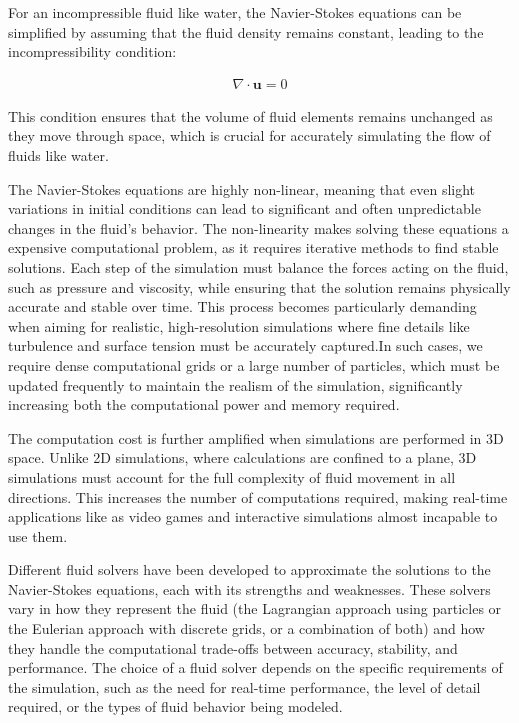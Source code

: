 For an incompressible fluid like water, the Navier-Stokes equations can be simplified by assuming that the fluid density remains constant, leading to the incompressibility condition:

\begin{align}
    \nabla \cdot \mathbf{u} = 0
\end{align}

This condition ensures that the volume of fluid elements remains unchanged as they move through space, which is crucial for accurately simulating the flow of fluids like water.

The Navier-Stokes equations are highly non-linear, meaning that even slight variations in initial conditions can lead to significant and often unpredictable changes in the fluid's behavior. The non-linearity makes solving these equations a expensive computational problem, as it requires iterative methods to find stable solutions. Each step of the simulation must balance the forces acting on the fluid, such as pressure and viscosity, while ensuring that the solution remains physically accurate and stable over time. This process becomes particularly demanding when aiming for realistic, high-resolution simulations where fine details like turbulence and surface tension must be accurately captured.In such cases, we require dense computational grids or a large number of particles, which must be updated frequently to maintain the realism of the simulation, significantly increasing both the computational power and memory required.

The computation cost is further amplified when simulations are performed in 3D space. Unlike 2D simulations, where calculations are confined to a plane, 3D simulations must account for the full complexity of fluid movement in all directions. This increases the number of computations required, making real-time applications like as video games and interactive simulations almost incapable to use them.

Different fluid solvers have been developed to approximate the solutions to the Navier-Stokes equations, each with its strengths and weaknesses. These solvers vary in how they represent the fluid (the Lagrangian approach using particles or the Eulerian approach with discrete grids, or a combination of both) and how they handle the computational trade-offs between accuracy, stability, and performance. The choice of a fluid solver depends on the specific requirements of the simulation, such as the need for real-time performance, the level of detail required, or the types of fluid behavior being modeled.

